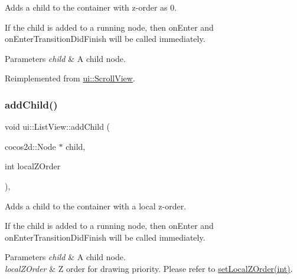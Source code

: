 Adds a child to the container with z-\/order as 0.

If the child is added to a \textquotesingle{}running\textquotesingle{} node, then \textquotesingle{}on\+Enter\textquotesingle{} and \textquotesingle{}on\+Enter\+Transition\+Did\+Finish\textquotesingle{} will be called immediately.


\begin{DoxyParams}{Parameters}
{\em child} & A child node. \\
\hline
\end{DoxyParams}


Reimplemented from \hyperlink{classui_1_1ScrollView_a6cdee934880e71245c6f5e6a2789c48a}{ui\+::\+Scroll\+View}.

\mbox{\label{classui_1_1ListView_a36ef7247ab78ee7019eca8c409a30356}} 
\subsubsection{\texorpdfstring{add\+Child()}{addChild()}\hspace{0.1cm}{\footnotesize\ttfamily [2/8]}}
{\footnotesize\ttfamily void ui\+::\+List\+View\+::add\+Child (\begin{DoxyParamCaption}\item[{cocos2d\+::\+Node $\ast$}]{child,  }\item[{int}]{local\+Z\+Order }\end{DoxyParamCaption})\hspace{0.3cm}{\ttfamily [override]}, {\ttfamily [virtual]}}

Adds a child to the container with a local z-\/order.

If the child is added to a \textquotesingle{}running\textquotesingle{} node, then \textquotesingle{}on\+Enter\textquotesingle{} and \textquotesingle{}on\+Enter\+Transition\+Did\+Finish\textquotesingle{} will be called immediately.


\begin{DoxyParams}{Parameters}
{\em child} & A child node. \\
\hline
{\em local\+Z\+Order} & Z order for drawing priority. Please refer to {\ttfamily \hyperlink{classNode_aee4e616c2d55b722226aae1e68b4946f}{set\+Local\+Z\+Order(int)}}. \\
\hline
\end{DoxyParams}


